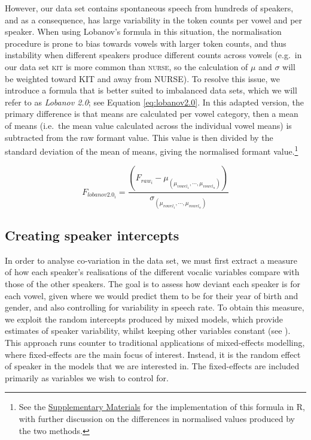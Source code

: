 \documentclass[review]{elsarticle} %
\begin{document}
 However, our data set contains spontaneous speech from hundreds of speakers, and as a consequence, has large variability in the token counts per vowel and per speaker. When using Lobanov's formula in this situation, the normalisation procedure is prone to bias towards vowels with larger token counts, and thus instability when different speakers produce different counts across vowels (e.g.\ in our data set \textsc{kit} is more common than \textsc{nurse}, so the calculation of $\mu$ and $\sigma$ will be weighted toward KIT and away from NURSE). To resolve this issue, we introduce a formula that is better suited to imbalanced data sets, which we will refer to as \textit{Lobanov 2.0}; see Equation \ref{eq:lobanov2.0}. In this adapted version, the primary difference is that means are calculated per vowel category, then a mean of means (i.e.\ the mean value calculated across the individual vowel means) is subtracted from the raw formant value. This value is then divided by the standard deviation of the mean of means, giving the normalised formant value.\footnote{See the \hyperref[sec:supplementarymaterials]{Supplementary Materials} for the implementation of this formula in R, with further discussion on the differences in normalised values produced by the two methods.}

\begin{equation}
F_{lobanov2.0_i} = \frac{(F_{raw_i}-\mu_{(\mu_{vowel_1},\cdots,\mu_{vowel_n})})}{\sigma_{(\mu_{vowel_1},\cdots,\mu_{vowel_n})}}
\label{eq:lobanov2.0}
\end{equation}


\subsection{Creating speaker intercepts}
\label{sec:intercepts}

In order to analyse co-variation in the data set, we must first extract a measure of how each speaker's realisations of the different vocalic variables compare with those of the other speakers. The goal is to assess how deviant each speaker is for each vowel, given where we would predict them to be for their year of birth and gender, and also controlling for variability in speech rate.  To obtain this measure, we exploit the random intercepts produced by mixed models, which provide estimates of speaker variability, whilst keeping other variables constant (see \citealt{drager2012exploiting}). This approach runs counter to traditional applications of mixed-effects modelling, where fixed-effects are the main focus of interest. Instead, it is the random effect of speaker in the models that we are interested in. The fixed-effects are included primarily as variables we wish to control for.
\end{document}

